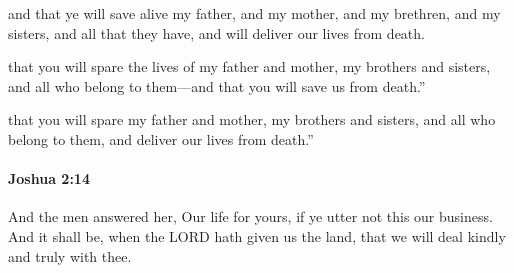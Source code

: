 			\begin{versebox}
					\item[BHS] 
					\item[ASV] and that ye will save alive my father, and my mother, and my brethren, and my sisters, and all that they have, and will deliver our lives from death.
					\item[NIV] that you will spare the lives of my father and mother, my brothers and sisters, and all who belong to them—and that you will save us from death.”
					\item[NRSV] that you will spare my father and mother, my brothers and sisters, and all who belong to them, and deliver our lives from death.”
			\end{versebox}

		\paragraph{Joshua 2:14} %
			\label{JOSHUA-2-14}

			And the men answered her, Our life for yours, if ye utter not this our business. And it shall be, when the LORD hath given us the land, that we will deal kindly and truly with thee.

